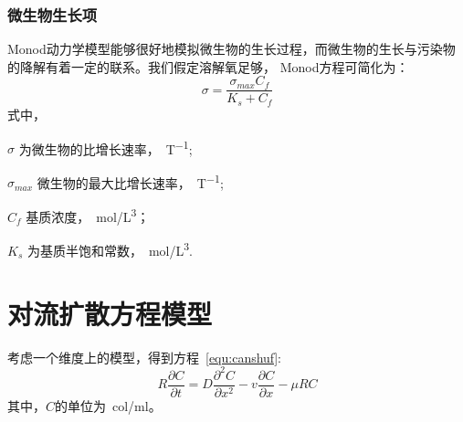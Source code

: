 \subsubsection{微生物生长项}
Monod动力学模型能够很好地模拟微生物的生长过程，而微生物的生长与污染物的降解有着一定的联系。我们假定溶解氧足够，
Monod方程可简化为：
\begin{equation}
\sigma = \dfrac{\sigma_{max}C_f}{K_s+C_f}
\end{equation}
式中，
\begin{paralist}
	\item[$\sigma$]为微生物的比增长速率，\SI{}{T^{-1}};
	\item[$\sigma_{max}$]微生物的最大比增长速率，\SI{}{T^{-1}};
	\item[$C_f$]基质浓度，\SI{}{mol/L^3}；
	\item[$K_s$]为基质半饱和常数，\SI{}{mol/L^3}.
\end{paralist}
\section{对流扩散方程模型}
考虑一个维度上的模型，得到方程~\ref{equ:canshuf}:
\begin{equation}\label{equ:canshuf}
	R\dfrac{\partial C}{\partial t} = D\dfrac{\partial^2 C}{\partial x^2}-v\dfrac{\partial C}{\partial x}-\mu RC
\end{equation}
其中，$C$的单位为\SI{}{col/ml}。\par

